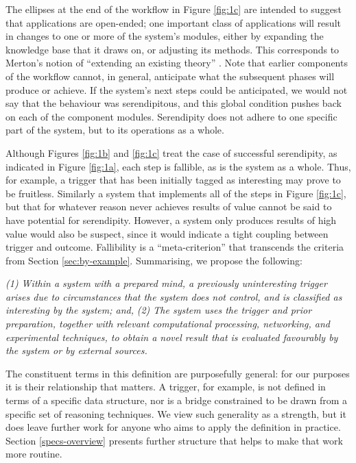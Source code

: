 The ellipses at the end of the workflow in Figure \ref{fig:1c} are
intended to suggest that applications are open-ended; one
important class of applications will result in changes to one or more
of the system's modules, either by expanding the knowledge base
that it draws on, or adjusting its methods.
This corresponds to Merton's notion of ``extending an existing theory''
\cite{merton1948bearing}.
Note that earlier components of the workflow
cannot, in general, anticipate what the subsequent phases will produce
or achieve.  If the system's next steps could be anticipated, we would
not say that the behaviour was serendipitous, and this global condition pushes back on each of the component modules.  
Serendipity does not adhere to one specific part of the system, but to
its operations as a whole.  

Although Figures  \ref{fig:1b} and  \ref{fig:1c}
treat the case of successful serendipity, as indicated in Figure
 \ref{fig:1a}, each step is fallible, as is the system as a whole.
Thus, for example, a trigger that has been initially tagged as interesting may prove to be fruitless.
Similarly a system that implements all of the steps in Figure \ref{fig:1c}, but that for whatever reason never
achieves results of value cannot be said to have potential for serendipity.
However, a system only produces results of high value would also be
suspect, since it would indicate a tight coupling between trigger
and outcome.  Fallibility is a ``meta-criterion'' that transcends the criteria from Section \ref{sec:by-example}.
Summarising, we propose the following:


\begin{mdframed}
\begin{ndef}\label{def:serendipity}
\emph{(1) Within a system with a prepared mind, a previously uninteresting trigger arises due to circumstances that the system does not control, and is classified as interesting by the system; and,}
\emph{(2) The system uses the trigger and prior preparation, together with relevant computational processing, networking, and experimental techniques, to obtain a novel result that is evaluated favourably by the system or by external sources.}
\end{ndef}
\end{mdframed}

The constituent terms in this definition are purposefully general: for
our purposes it is their relationship that matters.  A trigger, for
example, is not defined in terms of a specific data structure, nor is
a bridge constrained to be drawn from a specific set of reasoning
techniques.  We view such generality as a strength, but it does leave
further work for anyone who aims to apply the definition in practice.
Section \ref{specs-overview} presents further structure that helps to
make that work more routine.


